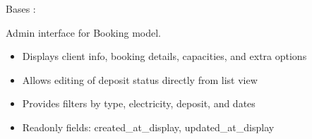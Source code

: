 \documentclass[letterpaper,10pt,french]{sphinxmanual}
\begin{document}

\begin{fulllineitems}
\label{\detokenize{index:bookings.admin.BookingAdmin}}
\pysigstartsignatures
\pysiglinewithargsret
{}
{\sphinxparamcomma {}}
{}
\pysigstopsignatures
\sphinxAtStartPar
Bases : 

\sphinxAtStartPar
Admin interface for Booking model.
\begin{itemize}
\item {} 
\sphinxAtStartPar
Displays client info, booking details, capacities, and extra options

\item {} 
\sphinxAtStartPar
Allows editing of deposit status directly from list view

\item {} 
\sphinxAtStartPar
Provides filters by type, electricity, deposit, and dates

\item {} 
\sphinxAtStartPar
Readonly fields: created\_at\_display, updated\_at\_display

\end{itemize}

\begin{fulllineitems}
\label{\detokenize{index:bookings.admin.BookingAdmin.list_display}}
\pysigstartsignatures
\pysigline
{}
\pysigstopsignatures
\end{fulllineitems}


\end{fulllineitems}
\end{document}
